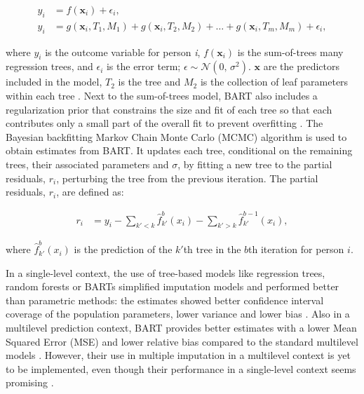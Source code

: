 \documentclass[10pt, a4paper, titlepage]{article}
\begin{document}
\begin{subequations}
\label{eq:BART}
\begin{align}
y_i &= f(\textbf{x}_i) + \epsilon_i, \tag{1.1} \\
y_i &= g(\textbf{x}_{i}, T_{1}, M_{1})+ g(\textbf{x}_{i}, T_{2}, M_{2}) + \dots + g(\textbf{x}_{i}, T_{m}, M_{m}) + \epsilon_i, \tag{1.2}
\end{align}
\end{subequations}

where $y_i$ is the outcome variable for person \textit{i}, $f(\textbf{x}_i)$ is the sum-of-trees many regression trees, and $\epsilon_i$ is the error term; $\epsilon \sim \mathcal{N}(0,\,\sigma^{2})$. $\textbf{x}$ are the predictors included in the model, $T_{2}$ is the tree and $M_{2}$ is the collection of leaf parameters within each tree \cite{chipman2010, hill2020, james2021}. Next to the sum-of-trees model, BART also includes a regularization prior that constrains the size and fit of each tree so that each contributes only a small part of the overall fit to prevent overfitting \cite{chipman2010, hill2020, james2021}. The Bayesian backfitting Markov Chain Monte Carlo (MCMC) algorithm is used to obtain estimates from BART. It updates each tree, conditional on the remaining trees, their associated parameters and $\sigma$, by fitting a new tree to the partial residuals, $r_{i}$, perturbing the tree from the previous iteration. The partial residuals, $r_{i}$, are defined as:

\begin{subequations}
\label{eq:partialresiduals}
\begin{align}
r_i &= y_i - \sum_{k' < k} \hat{f}^{b}_{k'}(x_{i}) - \sum_{k' > k} \hat{f}^{b-1}_{k'}(x_{i}), \tag{2}
\end{align}
\end{subequations}

where $\hat{f}^{b}_{k'}(x_{i})$ is the prediction of the $k'$th tree in the $b$th iteration for person $i$.

In a single-level context, the use of tree-based models like regression trees, random forests or BARTs simplified imputation models and performed better than parametric methods: the estimates showed better confidence interval coverage of the population parameters, lower variance and lower bias \cite{burgette2010, xu2016}. Also in a multilevel prediction context, BART provides better estimates with a lower Mean Squared Error (MSE) and lower relative bias compared to the standard multilevel models \cite{wagner2020, chen2020}. However, their use in multiple imputation in a multilevel context is yet to be implemented, even though their performance in a single-level context seems promising \cite{burgette2010, xu2016}.
\end{document}
